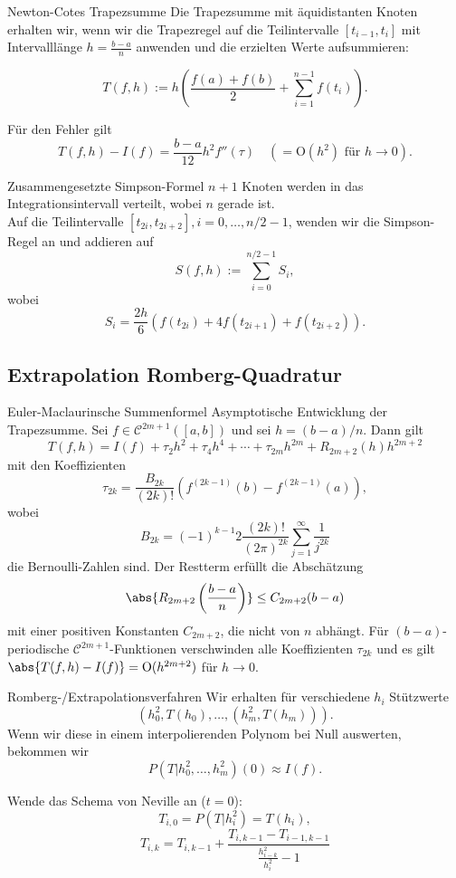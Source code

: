 \begin{karte}{Newton-Cotes Trapezsumme}
    Die Trapezsumme mit äquidistanten Knoten erhalten wir, wenn wir die Trapezregel auf die 
    Teilintervalle \( [t_{i-1}, t_i] \) mit Intervalllänge \( h = \frac{b-a}{n} \) 
    anwenden und die erzielten Werte aufsummieren:

    \[ T(f,h) := h\left( \frac{f(a) + f(b)}{2} + \sum_{i=1}^{n-1} f(t_i) \right). \]

    Für den Fehler gilt 
    \[ T(f,h) - I(f) = \frac{b-a}{12} h^2 f''(\tau) \quad (=\mathrm{O}(h^2) \text{ für } h\rightarrow 0). \]
\end{karte}

\begin{karte}{Zusammengesetzte Simpson-Formel}
    \( n+1 \) Knoten werden in das Integrationsintervall verteilt, wobei \(n\) gerade ist. \\
    Auf die Teilintervalle \( [t_{2i}, t_{2i+2}], i = 0,\ldots, n/2-1 \), wenden wir die Simpson-Regel an 
    und addieren auf 
    \[ S(f,h) := \sum_{i=0}^{n/2-1} S_i, \]
    wobei 
    \[ S_i = \frac{2h}{6} ( f(t_{2i}) + 4f(t_{2i+1}) + f(t_{2i+2}) ). \]
\end{karte}

\subsection*{Extrapolation Romberg-Quadratur}

\begin{karte}{Euler-Maclaurinsche Summenformel}
    Asymptotische Entwicklung der Trapezsumme.
    Sei \(f \in \mathcal{C}^{2m+1}([a,b])\) und sei \( h = (b-a)/n \). Dann gilt 
    \[ T(f,h) = I(f) + \tau_2 h^2 + \tau_4 h^4 + \cdots + \tau_{2m} h^{2m} + R_{2m+2}(h) h^{2m+2} \]
    mit den Koeffizienten 
    \[ \tau_{2k} = \frac{B_{2k}}{(2k)!} \left( f^{(2k-1)}(b) - f^{(2k-1)}(a) \right), \]
    wobei 
    \[ B_{2k} = (-1)^{k-1} 2 \frac{(2k)!}{(2\pi)^{2k}} \sum_{j=1}^\infty \frac{1}{j^{2k}} \]
    die Bernoulli-Zahlen sind. Der Restterm erfüllt die Abschätzung 
    \[ \abs{ R_{2m+2}\left( \frac{b-a}{n} \right) } \leq C_{2m+2}(b-a) \]
    mit einer positiven Konstanten \( C_{2m+2} \), die nicht von \(n\) abhängt.
    Für \( (b-a) \)-periodische \( \mathcal{C}^{2m+1} \)-Funktionen verschwinden alle Koeffizienten 
    \( \tau_{2k} \) und es gilt \( \abs{ T(f,h) - I(f) } = \mathrm{O}(h^{2m+2}) \) für \(h\rightarrow 0\).
\end{karte}

\begin{karte}{Romberg-/Extrapolationsverfahren}
    Wir erhalten für verschiedene \( h_i \) Stützwerte 
    \[ (h_0^2, T(h_0), \ldots, (h_m^2, T(h_m))). \]
    Wenn wir diese in einem interpolierenden Polynom bei Null auswerten, bekommen wir 
    \[ P(T|h_0^2, \ldots, h_m^2)(0) \approx I(f). \]

    Wende das Schema von Neville an (\(t=0\)):
    \[ T_{i,0} = P(T|h_i^2) = T(h_i), \]
    \[ T_{i,k} = T_{i,k-1} + \frac{ T_{i,k-1} - T_{i-1,k-1} }{\frac{ h_{i-k}^2 }{h_i^2} - 1} \]
\end{karte}

